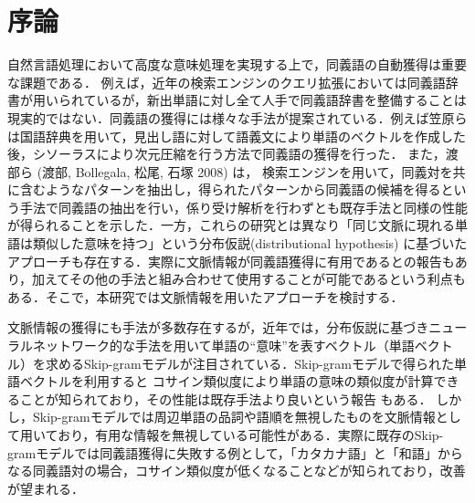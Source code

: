 \documentclass[japanese]{jnlp_1.4}
\begin{document}
\maketitle


\section{序論}
\label{sec:introduction}

自然言語処理において高度な意味処理を実現する上で，同義語の自動獲得は重要な課題である\cite{inui}．
例えば，近年の検索エンジンのクエリ拡張においては同義語辞書が用いられている\cite{utsumi}が，新出単語に対し全て人手で同義語辞書を整備することは現実的ではない．同義語の獲得には様々な手法が提案されている．例えば笠原ら\cite{kato}は国語辞典を用いて，見出し語に対して語義文により単語のベクトルを作成した後，シソーラスにより次元圧縮を行う方法で同義語の獲得を行った．
また，渡部ら (渡部, Bollegala, 松尾, 石塚 2008) は，\nocite{watanabe}
検索エンジンを用いて，同義対を共に含むようなパターンを抽出し，得られたパターンから同義語の候補を得るという手法で同義語の抽出を行い，係り受け解析を行わずとも既存手法と同様の性能が得られることを示した．一方，これらの研究とは異なり「同じ文脈に現れる単語は類似した意味を持つ」という分布仮説(distributional hypothesis) \cite{harris}に基づいたアプローチも存在する．実際に文脈情報が同義語獲得に有用であるとの報告\cite{hagiwara}もあり，加えてその他の手法と組み合わせて使用することが可能であるという利点もある．そこで，本研究では文脈情報を用いたアプローチを検討する．

文脈情報の獲得にも手法が多数存在するが，近年では，分布仮説に基づきニューラルネットワーク的な手法を用いて単語の``意味''を表すベクトル（単語ベクトル）を求めるSkip-gramモデル\cite{mikolov1}が注目されている．Skip-gramモデルで得られた単語ベクトルを利用すると
コサイン類似度により単語の意味の類似度が計算できることが知られており，その性能は既存手法より良いという報告
\cite{roy}
もある．
しかし，Skip-gramモデルでは周辺単語の品詞や語順を無視したものを文脈情報として用いており，有用な情報を無視している可能性がある．実際に既存のSkip-gramモデルでは同義語獲得に失敗する例として，「カタカナ語」と「和語」からなる同義語対の場合，コサイン類似度が低くなることなどが知られており\cite{joko}，改善が望まれる．
\end{document}
